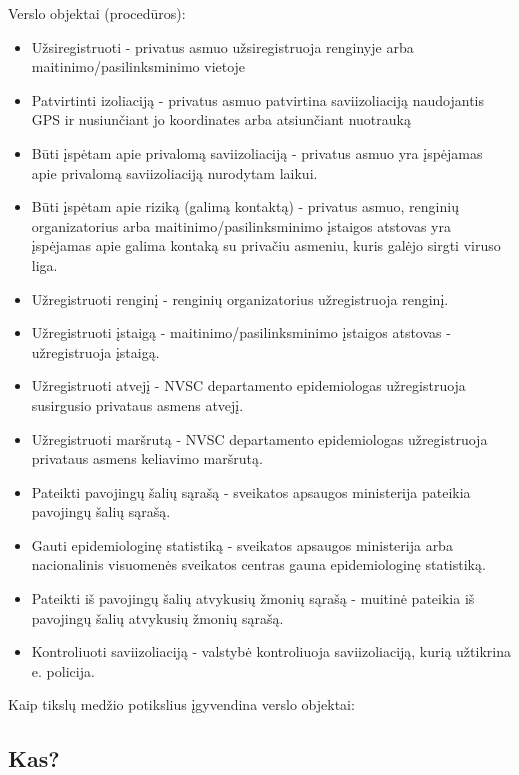 \documentclass{VUMIFPSkursinis}
\begin{document}
\noindent Verslo objektai (procedūros):
	\begin{itemize}
		\item Užsiregistruoti - privatus asmuo užsiregistruoja renginyje arba maitinimo/pasilinksminimo vietoje
		\item Patvirtinti izoliaciją - privatus asmuo patvirtina saviizoliaciją naudojantis GPS ir nusiunčiant jo koordinates arba atsiunčiant nuotrauką
		\item Būti įspėtam apie privalomą saviizoliaciją - privatus asmuo yra įspėjamas apie privalomą saviizoliaciją nurodytam laikui.
		\item Būti įspėtam apie riziką (galimą kontaktą) - privatus asmuo, renginių organizatorius arba maitinimo/pasilinksminimo įstaigos atstovas yra įspėjamas apie galima kontaką su privačiu asmeniu, kuris galėjo sirgti viruso liga.
		\item Užregistruoti renginį - renginių organizatorius užregistruoja renginį.
		\item Užregistruoti įstaigą - maitinimo/pasilinksminimo įstaigos atstovas - užregistruoja įstaigą.
		\item Užregistruoti atvejį - NVSC departamento epidemiologas užregistruoja susirgusio privataus asmens atvejį.
		\item Užregistruoti maršrutą - NVSC departamento epidemiologas užregistruoja privataus asmens keliavimo maršrutą.
		\item Pateikti pavojingų šalių sąrašą - sveikatos apsaugos ministerija pateikia pavojingų šalių sąrašą.
		\item Gauti epidemiologinę statistiką - sveikatos apsaugos ministerija arba nacionalinis visuomenės sveikatos centras gauna epidemiologinę statistiką.
		\item Pateikti iš pavojingų šalių atvykusių žmonių sąrašą - muitinė pateikia iš pavojingų šalių atvykusių žmonių sąrašą.
		\item Kontroliuoti saviizoliaciją - valstybė kontroliuoja saviizoliaciją, kurią užtikrina e. policija.
	\end{itemize}

\noindent Kaip tikslų medžio potikslius įgyvendina verslo objektai:


\subsection{Kas?}
\end{document}
